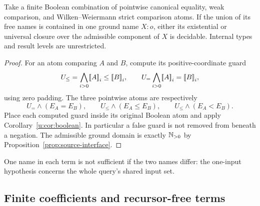 \begin{corollary}
\label{cor:source-one-name}
Take a finite Boolean combination of pointwise canonical equality, weak
comparison, and Wilken--Weiermann strict comparison atoms.  If the union
of its free names is contained in one ground name $X:o$, either its
existential or universal closure over the admissible component of $X$
is decidable.  Internal types and result levels are unrestricted.
\end{corollary}
\begin{proof}
For an atom comparing $A$ and $B$, compute its positive-coordinate guard
\[
 U_{\le}=\bigwedge_{i>0}\can A_i\le\can B_i,
 \qquad
 U_=\bigwedge_{i>0}\can A_i=\can B_i,
\]
using zero padding.  The three pointwise atoms are respectively
\[
 U_=\wedge(E_A=E_B),\qquad
 U_{\le}\wedge(E_A\le E_B),\qquad
 U_{\le}\wedge(E_A<E_B).
\]
Place each computed guard inside its original Boolean atom and apply
Corollary~\ref{u:cor:boolean}.  In particular a false guard is not
removed from beneath a negation.  The admissible ground domain is exactly
$\mathbb N_{>0}$ by Proposition~\ref{prop:source-interface}.
\end{proof}

One name in each term is not sufficient if the two names differ: the
one-input hypothesis concerns the whole query's shared input set.

\subsection{Finite coefficients and recursor-free terms}

